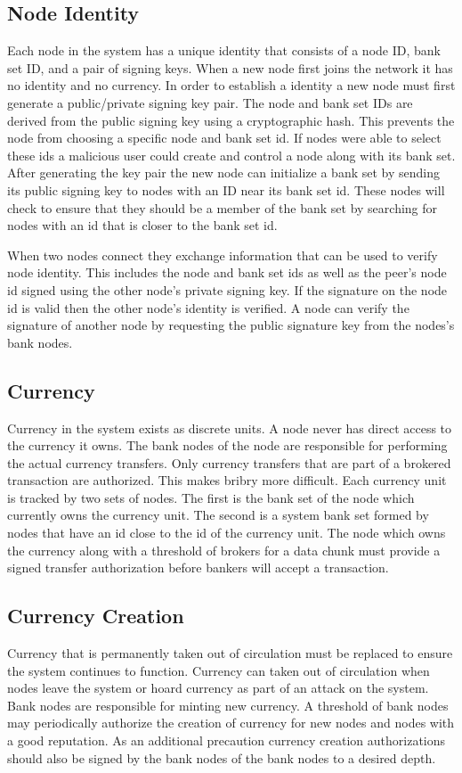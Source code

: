 \documentclass[%
				10pt,
        final,
        notitlepage,
        narroweqnarray,
        inline,
        twoside,
        ]{ieee}
\begin{document}
\subsection{Node Identity}
Each node in the system has a unique identity that consists of a node ID, bank set ID, and a pair of signing keys.  When a new node first joins the network it has no identity and no currency. In order to establish a identity a new node must first generate a public/private signing key pair.  The node and bank set IDs are derived from the public signing key using a cryptographic hash.  This prevents the node from choosing a specific node and bank set id.  If nodes were able to select these ids a malicious user could create and control a node along with its bank set.  After generating the key pair the new node can initialize a bank set by sending its public signing key to nodes with an ID near its bank set id.  These nodes will check to ensure that they should be a member of the bank set by searching for nodes with an id that is closer to the bank set id.  

When two nodes connect they exchange information that can be used to verify node identity.  This includes the node and bank set ids as well as the peer's node id signed using the other node's private signing key.  If the signature on the node id is valid then the other node's identity is verified.  A node can verify the signature of another node by requesting the public signature key from the nodes's bank nodes.

\subsection{Currency}
Currency in the system exists as discrete units.  A node never has direct access to the currency it owns.  The bank nodes of the node are responsible for performing the actual currency transfers.  Only currency transfers that are part of a brokered transaction are authorized. This makes bribry more difficult. Each currency unit is tracked by two sets of nodes.  The first is the bank set of the node which currently owns the currency unit. The second is a system bank set formed by nodes that have an id close to the id of the currency unit. The node which owns the currency along with a threshold of brokers for a data chunk must provide a signed transfer authorization before bankers will accept a transaction.

\subsection{Currency Creation}
Currency that is permanently taken out of circulation must be replaced to ensure the system continues to function.  Currency can taken out of circulation when nodes leave the system or hoard currency as part of an attack on the system.  Bank nodes are responsible for minting new currency.  A threshold of bank nodes may periodically authorize the creation of currency for new nodes and nodes with a good reputation. As an additional precaution currency creation authorizations should also be signed by the bank nodes of the bank nodes to a desired depth.
\end{document}
